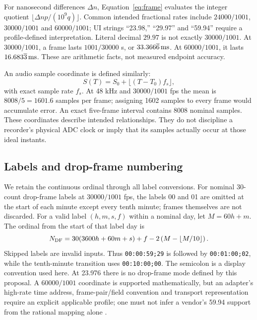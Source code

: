 \documentclass[11pt,letterpaper]{article}
\newcommand{\code}[1]{\texttt{#1}}
\begin{document}
For nanosecond differences $\Delta n$, Equation~\ref{eq:frame} evaluates the integer quotient $\lfloor\Delta n p/(10^9q)\rfloor$. Common intended fractional rates include $24000/1001$, $30000/1001$ and $60000/1001$; UI strings ``23.98,'' ``29.97'' and ``59.94'' require a profile-defined interpretation. Literal decimal $29.97$ is not exactly $30000/1001$. At $30000/1001$, a frame lasts $1001/30000$ s, or $33.366\overline{6}\,\mathrm{ms}$. At $60000/1001$, it lasts $16.683\overline{3}\,\mathrm{ms}$. These are arithmetic facts, not measured endpoint accuracy.

An audio sample coordinate is defined similarly:
\begin{equation}
 S(T)=S_0+\lfloor (T-T_0)f_s\rfloor,\label{eq:sample}
\end{equation}
with exact sample rate $f_s$. At 48 kHz and $30000/1001$ fps the mean is $8008/5=1601.6$ samples per frame; assigning 1602 samples to every frame would accumulate error. An exact five-frame interval contains 8008 nominal samples. These coordinates describe intended relationships. They do not discipline a recorder's physical ADC clock or imply that its samples actually occur at those ideal instants.

\subsection{Labels and drop-frame numbering}
We retain the continuous ordinal through all label conversions. For nominal 30-count drop-frame labels at $30000/1001$ fps, the labels 00 and 01 are omitted at the start of each minute except every tenth minute; frames themselves are not discarded. For a valid label $(h,m,s,f)$ within a nominal day, let $M=60h+m$. The ordinal from the start of that label day is
\begin{equation}
 N_{\rm DF}=30(3600h+60m+s)+f-2\left(M-\left\lfloor M/10\right\rfloor\right).
 \label{eq:df}
\end{equation}
Skipped labels are invalid inputs. Thus \code{00:00:59;29} is followed by \code{00:01:00;02}, while the tenth-minute transition uses \code{00:10:00;00}. The semicolon is a display convention used here. At 23.976 there is no drop-frame mode defined by this proposal. A $60000/1001$ coordinate is supported mathematically, but an adapter's high-rate time address, frame-pair/field convention and transport representation require an explicit applicable profile; one must not infer a vendor's 59.94 support from the rational mapping alone \cite{st12}.
\end{document}

